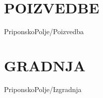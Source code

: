 
\section{POIZVEDBE}\label{sec:SAPoizvedbe}
{PriponskoPolje/Poizvedba}


\section{GRADNJA}\label{sec:SAIzgradnja}
{PriponskoPolje/Izgradnja}

